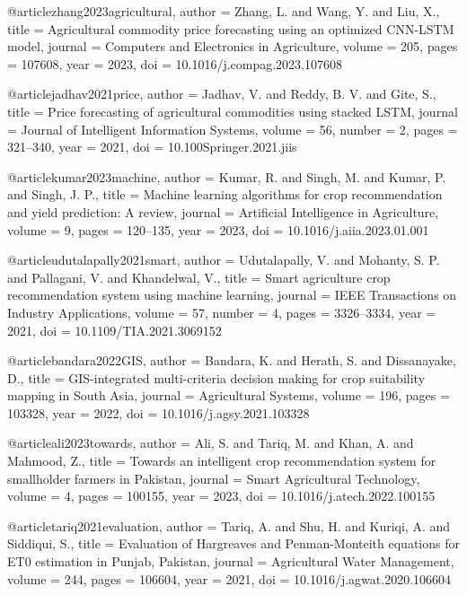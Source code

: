 @article{zhang2023agricultural,
  author  = {Zhang, L. and Wang, Y. and Liu, X.},
  title   = {Agricultural commodity price forecasting using an optimized CNN-LSTM model},
  journal = {Computers and Electronics in Agriculture},
  volume  = {205},
  pages   = {107608},
  year    = {2023},
  doi     = {10.1016/j.compag.2023.107608}
}

@article{jadhav2021price,
  author  = {Jadhav, V. and Reddy, B. V. and Gite, S.},
  title   = {Price forecasting of agricultural commodities using stacked LSTM},
  journal = {Journal of Intelligent Information Systems},
  volume  = {56},
  number  = {2},
  pages   = {321--340},
  year    = {2021},
  doi     = {10.100Springer.2021.jiis}
}

@article{kumar2023machine,
  author  = {Kumar, R. and Singh, M. and Kumar, P. and Singh, J. P.},
  title   = {Machine learning algorithms for crop recommendation and yield prediction: A review},
  journal = {Artificial Intelligence in Agriculture},
  volume  = {9},
  pages   = {120--135},
  year    = {2023},
  doi     = {10.1016/j.aiia.2023.01.001}
}

@article{udutalapally2021smart,
  author  = {Udutalapally, V. and Mohanty, S. P. and Pallagani, V. and Khandelwal, V.},
  title   = {Smart agriculture crop recommendation system using machine learning},
  journal = {IEEE Transactions on Industry Applications},
  volume  = {57},
  number  = {4},
  pages   = {3326--3334},
  year    = {2021},
  doi     = {10.1109/TIA.2021.3069152}
}

@article{bandara2022GIS,
  author  = {Bandara, K. and Herath, S. and Dissanayake, D.},
  title   = {GIS-integrated multi-criteria decision making for crop suitability mapping in South Asia},
  journal = {Agricultural Systems},
  volume  = {196},
  pages   = {103328},
  year    = {2022},
  doi     = {10.1016/j.agsy.2021.103328}
}

@article{ali2023towards,
  author  = {Ali, S. and Tariq, M. and Khan, A. and Mahmood, Z.},
  title   = {Towards an intelligent crop recommendation system for smallholder farmers in Pakistan},
  journal = {Smart Agricultural Technology},
  volume  = {4},
  pages   = {100155},
  year    = {2023},
  doi     = {10.1016/j.atech.2022.100155}
}

@article{tariq2021evaluation,
  author  = {Tariq, A. and Shu, H. and Kuriqi, A. and Siddiqui, S.},
  title   = {Evaluation of Hargreaves and Penman-Monteith equations for ET0 estimation in Punjab, Pakistan},
  journal = {Agricultural Water Management},
  volume  = {244},
  pages   = {106604},
  year    = {2021},
  doi     = {10.1016/j.agwat.2020.106604}
}

